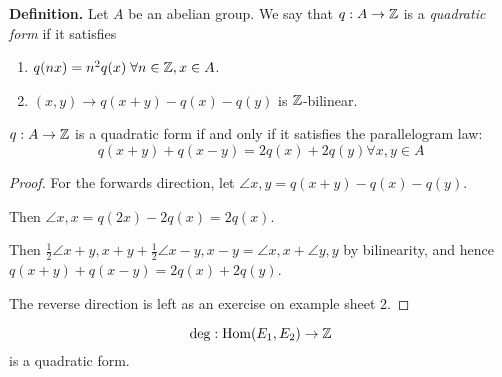 \documentclass[10pt,a4paper]{article}
\begin{document}
\textbf{Definition.} Let $A$ be an abelian group. We say that $q:A \to \mathbb{Z}$ is a \emph{quadratic form} if it satisfies
\begin{enumerate}
  \item $q(nx) = n^2q(x) \forall n \in \Z, x \in A$.
  \item $(x,y) \to q(x+y)-q(x)-q(y)$ is $\mathbb{Z}$-bilinear.
\end{enumerate}
\begin{lemma}
  $q:A \to \mathbb{Z}$ is a quadratic form if and only if it satisfies the parallelogram law:
  \[q(x+y)+q(x-y) = 2q(x)+2q(y) \forall x,y \in A\]
\end{lemma}
\begin{proof}
  For the forwards direction, let $\angle{x,y} = q(x+y)-q(x)-q(y)$.

  Then $\angle{x,x} = q(2x)-2q(x) = 2q(x)$.

  Then $\frac{1}{2}\angle{x+y,x+y} + \frac{1}{2}\angle{x-y,x-y} = \angle{x,x}+\angle{y,y}$ by bilinearity, and hence $q(x+y)+q(x-y) = 2q(x)+2q(y)$.

  The reverse direction is left as an exercise on example sheet 2.
\end{proof}
\begin{theorem}
  \[\deg : \operatorname{Hom}(E_1, E_2) \to \mathbb{Z}\]
  is a quadratic form.
\end{theorem}
\end{document}
